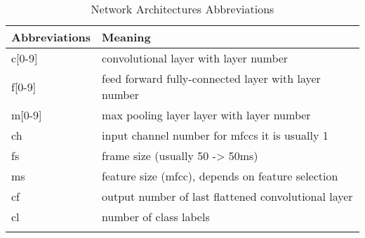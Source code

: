 \begin{table}[ht!]
\small
\begin{center}
\caption{Network Architectures Abbreviations}
\begin{tabular}{ M{2.5cm}  M{10cm} }
\toprule
\textbf{Abbreviations} & \textbf{Meaning}\\
\midrule
c[0-9] & convolutional layer with layer number\\
f[0-9] & feed forward fully-connected layer with layer number\\
m[0-9] & max pooling layer layer with layer number\\
ch & input channel number for mfccs it is usually 1\\
fs & frame size (usually 50 -> 50ms)\\
ms & feature size (mfcc), depends on feature selection\\
cf & output number of last flattened convolutional layer\\
cl & number of class labels\\
\bottomrule
\label{tab:nn_arch_abbreviation}
\end{tabular}
\end{center}
\vspace{-4mm}
\end{table}
\FloatBarrier
\noindent